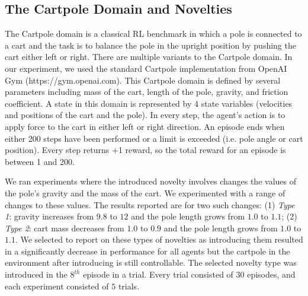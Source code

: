 \documentclass[letterpaper]{article} %
\newcommand{\hydra}{\textsc{Hydra}\xspace} %
\begin{document}
\subsection{The Cartpole Domain and Novelties}

The Cartpole domain is a classical RL benchmark in which a pole is connected to a cart and the task is to balance the pole in the upright position by pushing the cart either left or right. 
There are multiple variants to the Cartpole domain. 
In our experiment, we used the standard Cartpole implementation 
from OpenAI Gym (https://gym.openai.com). 
This Cartpole domain is defined by several parameters including mass of the cart, length of the pole, gravity, and friction coefficient. 
A state in this domain is represented by 4 state variables (velocities and positions of the cart and the pole).
In every step, the agent's action is to apply force to the cart in either left or right direction. 
An episode ends when either 200 steps have been performed or a limit is exceeded (i.e. pole angle or cart position). %
Every step returns +1 reward, so the total reward for an episode is between 1 and 200. 


We ran experiments where the introduced novelty involves changes the values of the pole's gravity and the mass of the cart. We experimented with a range of changes to these values. The results reported are for two such changes: 
(1) \emph{Type 1}: gravity increases from $9.8$ to $12$ and the pole length grows from $1.0$ to $1.1$;
(2) \emph{Type 2}: cart mass decreases from $1.0$ to $0.9$ and the pole length grows from $1.0$ to $1.1$. 
We selected to report on these types of novelties as introducing them resulted in a significantly decrease in performance for all agents but the cartpole in the environment after introducing is still controllable.  
The selected novelty type was introduced in the $8^{th}$ episode in a trial. 
Every trial consisted of $30$ episodes, and each experiment consisted of $5$ trials.



\end{document}
